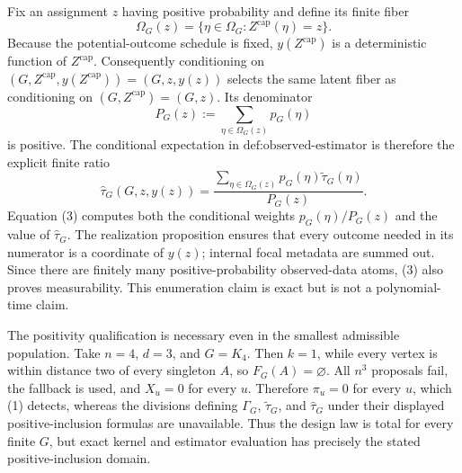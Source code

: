 Fix an assignment \(z\) having positive probability and define its finite fiber
\[
 \Omega_G(z)=\{\eta\in\Omega_G:Z^{\mathrm{cap}}(\eta)=z\}.
\]
Because the potential-outcome schedule is fixed, \(y(Z^{\mathrm{cap}})\) is a deterministic function of \(Z^{\mathrm{cap}}\).  Consequently conditioning on \((G,Z^{\mathrm{cap}},y(Z^{\mathrm{cap}}))=(G,z,y(z))\) selects the same latent fiber as conditioning on \((G,Z^{\mathrm{cap}})=(G,z)\).  Its denominator
\[
 P_G(z):=\sum_{\eta\in\Omega_G(z)}p_G(\eta)
\]
is positive.  The conditional expectation in \(\text{def:observed-estimator}\) is therefore the explicit finite ratio
\[
 \widehat\tau_G(G,z,y(z))
 =\frac{\displaystyle
       \sum_{\eta\in\Omega_G(z)}p_G(\eta)\widetilde\tau_G(\eta)}
      {\displaystyle P_G(z)}. \tag{3}
\]
Equation (3) computes both the conditional weights \(p_G(\eta)/P_G(z)\) and the value of \(\widehat\tau_G\).  The realization proposition ensures that every outcome needed in its numerator is a coordinate of \(y(z)\); internal focal metadata are summed out.  Since there are finitely many positive-probability observed-data atoms, (3) also proves measurability.  This enumeration claim is exact but is not a polynomial-time claim.

The positivity qualification is necessary even in the smallest admissible population.  Take \(n=4\), \(d=3\), and \(G=K_4\).  Then \(k=1\), while every vertex is within distance two of every singleton \(A\), so \(F_G(A)=\varnothing\).  All \(n^3\) proposals fail, the fallback is used, and \(X_u=0\) for every \(u\).  Therefore \(\pi_u=0\) for every \(u\), which (1) detects, whereas the divisions defining \(\Gamma_G\), \(\widetilde\tau_G\), and \(\widehat\tau_G\) under their displayed positive-inclusion formulas are unavailable.  Thus the design law is total for every finite \(G\), but exact kernel and estimator evaluation has precisely the stated positive-inclusion domain.

